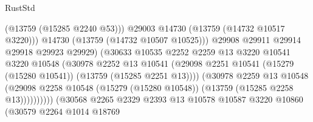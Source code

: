\begin{lexlean}{RustStd}
\begin{coremodule}
                                                (@13759 (@15285 @2240 @53)))
                                              @29003
                                              @14730
                                              (@13759 (@14732 @10517 @3220)))
                                            @14730
                                            (@13759 (@14732 @10507 @10525)))
                                          @29908
                                          @29911
                                          @29914
                                          @29918
                                          @29923
                                          @29929)
                                        (@30633
                                          @10535
                                          @2252
                                          @2259
                                          @13
                                          @3220
                                          @10541
                                          @3220
                                          @10548
                                          (@30978
                                            @2252
                                            @13
                                            @10541
                                            (@29098
                                              @2251
                                              @10541
                                              (@15279 (@15280 @10541))
                                              (@13759 (@15285 @2251 @13))))
                                          (@30978
                                            @2259
                                            @13
                                            @10548
                                            (@29098
                                              @2258
                                              @10548
                                              (@15279 (@15280 @10548))
                                              (@13759 (@15285 @2258 @13))))))))))
                              (@30568
                                @2265
                                @2329
                                @2393
                                @13
                                @10578
                                @10587
                                @3220
                                @10860
                                (@30579
                                  @2264
                                  @1014
                                  @18769

\end{coremodule}
\end{lexlean}
